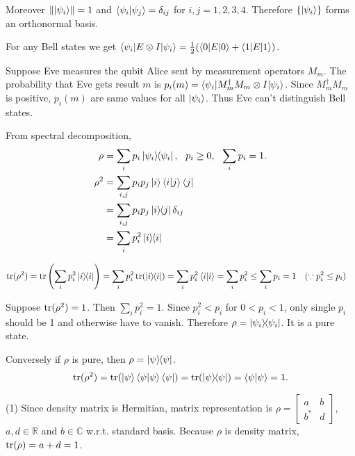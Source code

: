 Moreover $\left\lVert\ket{\psi_i}\right\rVert = 1$ and $\braket{\psi_i | \psi_j} = \delta_{ij}$ for $i,j = 1, 2, 3, 4$.
Therefore $\{\ket{\psi_i}\}$ forms an orthonormal basis.





For any Bell states we get $\braket{\psi_i | E \otimes I | \psi_i} = \frac{1}{2} (\braket{0|E|0} + \braket{1|E|1})$.

Suppose Eve measures the qubit Alice sent by measurement operators $M_m$.
The probability that Eve gets result $m$ is $p_i(m) = \braket{\psi_i | M_m^\dagger M_m \otimes I | \psi_i}$.
Since $M ^\dagger_m M_m$ is positive, $p_i(m)$ are same values for all $\ket{\psi_i}$.
Thus Eve can't distinguish Bell states.





From spectral decomposition,
\begin{align*}
    \rho &= \sum_i p_i \ket{\psi_i}\hspace{-1mm} \bra{\psi_i}, ~~ p_i \geq 0, ~~ \sum_i p_i = 1.\\
    \rho^2 &= \sum_{i,j} p_i p_j \ket{i}\braket{i|j}\bra{j}\\
        &= \sum_{i,j} p_i p_j \ket{i}\hspace{-1mm} \bra{j}\delta_{ij}\\
        &= \sum_i p_i^2 \ket{i}\hspace{-1mm} \bra{i}
\end{align*}

\begin{align*}
    \operatorname{tr} (\rho^2) &= \operatorname{tr} \left(\sum_i p_i^2 \ket{i}\hspace{-1mm} \bra{i}\right)
        = \sum_i p_i^2 \operatorname{tr}(\ket{i}\hspace{-1mm} \bra{i})
        = \sum_i p_i^2 \braket{i|i}
        = \sum_i p_i^2
        \leq \sum_i p_i = 1~~~ (\because p_i^2 \leq p_i)
\end{align*}

Suppose $\operatorname{tr} (\rho^2) = 1$. Then $\sum_i p_i^2 = 1$.
Since $p_i^2 < p_i$ for $0 < p_i < 1$,
only single $p_i$ should be 1 and otherwise have to  vanish.
Therefore $\rho = \ket{\psi_i}\hspace{-1mm} \bra{\psi_i}$. It is a pure state.

Conversely if $\rho$ is pure, then $\rho = \ket{\psi}\hspace{-1mm} \bra{\psi}$.
\begin{align*}
    \operatorname{tr} (\rho^2) = \operatorname{tr} (\ket{\psi}\braket{\psi | \psi} \bra{\psi}) = \operatorname{tr} (\ket{\psi}\hspace{-1mm} \bra{\psi}) = \braket{\psi | \psi} = 1.
\end{align*}




(1) Since density matrix is Hermitian, matrix representation is
$\rho = \begin{bmatrix}
    a & b \\ b^* & d
\end{bmatrix}$,
$a, d \in \mathds{R}$ and $b \in \mathds{C}$ w.r.t. standard basis.
Because $\rho$ is density matrix, $\operatorname{tr} (\rho) = a+d = 1$.

